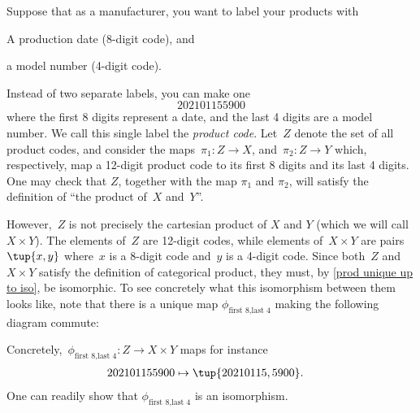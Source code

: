 \begin{example}\label{ex univ prop prod}
Suppose that as a manufacturer, you want to label your products with
\begin{compactitem}
\item A production date (8-digit code), and
\item a model number (4-digit code).
\end{compactitem}
Instead of two separate labels, you can make one
\begin{equation*}
  202101155900
\end{equation*}
where the first 8 digits represent a date, and the last 4 digits are a model number.
We call this single label the \emph{product code}. Let~$Z$ denote the set of all product codes, and consider the maps~$\pi_1\colon Z\to X$, and~$\pi_2\colon Z\to Y$ which, respectively, map a 12-digit product code to its first 8 digits and its last 4 digits. One may check that $Z$, together with the map $\pi_1$ and $\pi_2$, will satisfy the definition of ``the product of~$X$ and~$Y$''.


\begin{center}
\end{center}

However,~$Z$ is not precisely the cartesian product of $X$ and $Y$ (which we will call $X\times Y$). The elements of~$Z$ are 12-digit codes, while elements of~$X\times Y$ are pairs~$\tup{x,y}$ where~$x$ is a 8-digit code and~$y$ is a 4-digit code. Since both~$Z$ and~$X\times Y$ satisfy the definition of categorical product, they must, by \cref{prod unique up to iso}, be isomorphic.
To see concretely what this isomorphism between them looks like, note that there is a unique map $\phi_{\text{first 8},\text{last 4}}$ making the following diagram commute:
\begin{center}
\end{center}
Concretely,~$\phi_{\text{first 8},\text{last 4}}: Z \to X\times Y$ maps for instance
\begin{equation*}
\begin{aligned}
    202101155900&\mapsto \tup{20210115,5900}.
\end{aligned}
\end{equation*}
One can readily show that $\phi_{\text{first 8},\text{last 4}}$ is an isomorphism.
\end{example}


